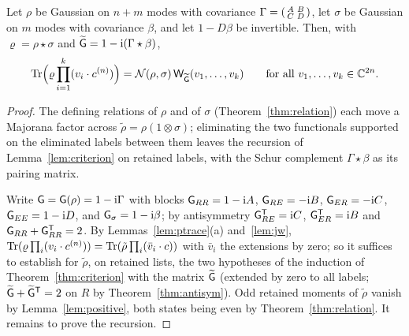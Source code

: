 \begin{theorem}\label{thm:state-contract}
Let $\rho$ be Gaussian on $n+m$ modes with covariance
$\Gamma=\begin{psmallmatrix}A&B\\C&D\end{psmallmatrix}$, let $\sigma$ be Gaussian on $m$ modes with
covariance $\beta$, and let $1-D\beta$ be invertible. Then, with $\varrho=\rho\star\sigma$ and
$\widetilde{\mathsf G}=1-\mathrm i(\Gamma\star\beta)$,
\[
 \operatorname{Tr}\Bigl(\varrho\prod_{i=1}^k(v_i\cdot c^{(n)})\Bigr)=\mathcal N(\rho,\sigma)\,\mathsf W_{\widetilde{\mathsf G}}(v_1,\ldots,v_k)
 \qquad\text{for all }v_1,\ldots,v_k\in\mathbb C^{2n}.
\]
\end{theorem}
\begin{proof}
The defining relations of $\rho$ and of $\sigma$ (Theorem~\ref{thm:relation}) each move a
Majorana factor across $\tilde\rho=\rho(1\otimes\sigma)$; eliminating the two functionals
supported on the eliminated labels between them leaves the recursion of
Lemma~\ref{lem:criterion} on retained labels, with the Schur complement $\Gamma\star\beta$ as
its pairing matrix. 

Write $\mathsf G=\mathsf G(\rho)=1-\mathrm i\Gamma$ with blocks $\mathsf G_{RR}=1-\mathrm i A$, $\mathsf G_{RE}=-\mathrm i B$, $\mathsf G_{ER}=-\mathrm i C$,
$\mathsf G_{EE}=1-\mathrm i D$, and $\mathsf G_\sigma=1-\mathrm i\beta$; by antisymmetry $\mathsf G_{RE}^{\mathsf T}=\mathrm i C$,
$\mathsf G_{ER}^{\mathsf T}=\mathrm i B$ and $\mathsf G_{RR}+\mathsf G_{RR}^{\mathsf T}=2$. By
Lemmas~\ref{lem:ptrace}(a) and~\ref{lem:jw},
$\operatorname{Tr}(\varrho\prod_i(v_i\cdot c^{(n)}))=\operatorname{Tr}(\tilde\rho\prod_i(\bar v_i\cdot c))$ with $\bar v_i$ the
extensions by zero; so it suffices to establish for $\tilde\rho$, on retained lists, the two
hypotheses of the induction of Theorem~\ref{thm:criterion} with the matrix $\widetilde{\mathsf G}$ (extended
by zero to all labels; $\widetilde{\mathsf G}+\widetilde{\mathsf G}^{\mathsf T}=2$ on $R$ by Theorem~\ref{thm:antisym}).
Odd retained moments of $\tilde\rho$ vanish by Lemma~\ref{lem:positive}, both states being even by
Theorem~\ref{thm:relation}. It remains to prove the recursion.


\end{proof}
